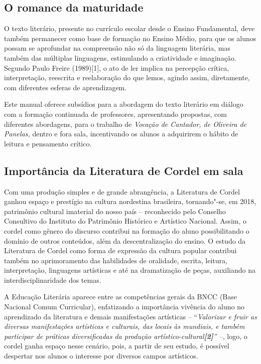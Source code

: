 \documentclass[12pt]{extarticle}
\begin{document}


\subsection{O romance da maturidade}

O texto literário, presente no currículo escolar desde o Ensino
Fundamental, deve também permanecer como base de formação no Ensino
Médio, para que os alunos possam se aprofundar na compreensão não só da
linguagem literária, mas também das múltiplas linguagens, estimulando a
criatividade e imaginação. Segundo Paulo Freire (1989){[}1{]}, o ato de
ler implica na percepção crítica, interpretação, reescrita e
reelaboração do que lemos, agindo assim, diretamente, com diferentes
esferas de aprendizagem.

Este manual oferece subsídios para a abordagem do texto literário em
diálogo com a formação continuada de professores, apresentando
propostas, com diferentes abordagens, para o trabalho de \emph{Vocação
de Cantador, de Oliveira de Panelas,} dentro e fora sala, incentivando
os alunos a adquirirem o hábito de leitura e pensamento crítico.

\subsection{Importância da Literatura de Cordel em sala}

Com uma produção simples e de grande abrangência, a Literatura de Cordel
ganhou espaço e prestígio na cultura nordestina brasileira, tornando"-se,
em 2018, patrimônio cultural imaterial do nosso país -- reconhecido pelo
Conselho Consultivo do Instituto do Patrimônio Histórico e Artístico
Nacional. Assim, o cordel como gênero do discurso contribui na formação
do aluno possibilitando o domínio de outros conteúdos, além da
descentralização do ensino. O estudo da Literatura de Cordel como forma
de expressão da cultura popular contribui também no aprimoramento das
habilidades de oralidade, escrita, leitura, interpretação, linguagens
artísticas e até na dramatização de peças, auxiliando na
interdisciplinaridade dos temas.

A Educação Literária aparece entre as competências gerais da BNCC (Base
Nacional Comum Curricular), enfatizando a importância vivência do aluno
no aprendizado da literatura e demais manifestações artísticas --
``\emph{Valorizar e fruir as diversas manifestações artísticas e
culturais, das locais às mundiais, e também participar de práticas
diversificadas da produção artístico-cultural\textbf{{[}2{]}}'' --},
logo, o cordel ganha espaço nesse cenário, pois, a partir de seu estudo,
é possível despertar nos alunos o interesse por diversos campos
artísticos.
\end{document}
